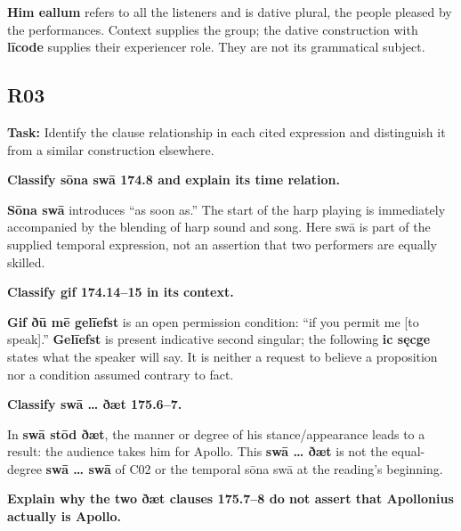 \textbf{Him eallum} refers to all the listeners and is dative plural, the people pleased by the performances. Context supplies the group; the dative construction with \textbf{līcode} supplies their experiencer role. They are not its grammatical subject.

\subsection*{R03}

\textbf{Task:} Identify the clause relationship in each cited expression and distinguish it from a similar construction elsewhere.

\textbf{Classify sōna swā 174.8 and explain its time relation.}

\textbf{Sōna swā} introduces “as soon as.” The start of the harp playing is immediately accompanied by the blending of harp sound and song. Here swā is part of the supplied temporal expression, not an assertion that two performers are equally skilled.

\textbf{Classify gif 174.14–15 in its context.}

\textbf{Gif ðū mē gelīefst} is an open permission condition: “if you permit me [to speak].” \textbf{Gelīefst} is present indicative second singular; the following \textbf{ic sęcge} states what the speaker will say. It is neither a request to believe a proposition nor a condition assumed contrary to fact.

\textbf{Classify swā … ðæt 175.6–7.}

In \textbf{swā stōd ðæt}, the manner or degree of his stance/\allowbreak{}appearance leads to a result: the audience takes him for Apollo. This \textbf{swā … ðæt} is not the equal-degree \textbf{swā … swā} of C02 or the temporal sōna swā at the reading's beginning.

\textbf{Explain why the two ðæt clauses 175.7–8 do not assert that Apollonius actually is Apollo.}

